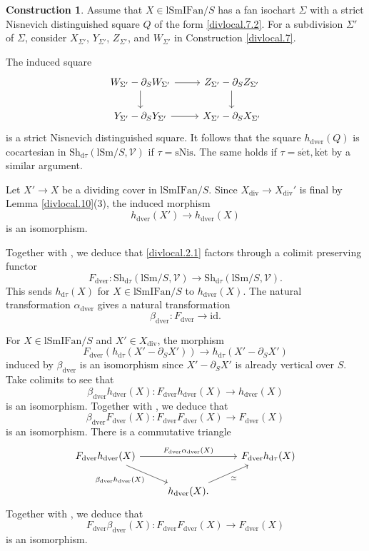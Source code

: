 \documentclass[10pt]{amsart}
\theoremstyle{definition}
\newtheorem{const}[thm]{Construction}
\theoremstyle{remark}
\numberwithin{equation}{subsection}
\newcommand{\cV}{\mathcal{V}}
\newcommand{\id}{\mathrm{id}}
\newcommand{\lSm}{\mathrm{lSm}}
\newcommand{\lSmIFan}{\mathrm{lSmIFan}}
\newcommand{\infShv}{\mathrm{Sh}}
\newcommand{\dver}{\mathrm{dver}}
\newcommand{\divi}{\mathrm{div}}
\newcommand{\dtau}{\mathrm{d}\tau}
\newcommand{\sNis}{\mathrm{sNis}}
\newcommand{\ketale}{\mathrm{k\acute{e}t}}
\newcommand{\setale}{\mathrm{s\acute{e}t}}
\begin{document}
\begin{const}
\label{divlocal.11}
Assume that $X\in \lSmIFan/S$ has a fan isochart $\Sigma$ with a strict Nisnevich distinguished square $Q$ of the form \eqref{divlocal.7.2}.
For a subdivision $\Sigma'$ of $\Sigma$, consider $X_{\Sigma'}$, $Y_{\Sigma'}$, $Z_{\Sigma'}$, and $W_{\Sigma'}$ in Construction \ref{divlocal.7}.

The induced square
\[
\begin{tikzcd}
W_{\Sigma'}-\partial_S W_{\Sigma'}\ar[d]\ar[r]&
Z_{\Sigma'}-\partial_S Z_{\Sigma'}\ar[d]
\\
Y_{\Sigma'}-\partial_S Y_{\Sigma'}\ar[r]&
X_{\Sigma'}-\partial_S X_{\Sigma'}
\end{tikzcd}
\]
is a strict Nisnevich distinguished square.
It follows that the square $h_{\dver}(Q)$ is cocartesian in $\infShv_{\dtau}(\lSm/S,\cV)$ if $\tau=\sNis$.
The same holds if $\tau=\setale,\ketale$ by a similar argument.

Let $X'\to X$ be a dividing cover in $\lSmIFan/S$.
Since $X_{\divi}\to X_{\divi}'$ is final by Lemma \ref{divlocal.10}(3), the induced morphism
\[
h_{\dver}(X')
\to
h_{\dver}(X)
\]
is an isomorphism.

Together with \cite[Proposition 5.5.4.20]{HTT}, we deduce that \eqref{divlocal.2.1} factors through a colimit preserving functor
\begin{equation}
\label{divlocal.2.2}
F_{\dver}
\colon
\infShv_{\dtau}(\lSm/S,\cV)
\to
\infShv_{\dtau}(\lSm/S,\cV).
\end{equation}
This sends $h_{\dtau}(X)$ for $X\in \lSmIFan/S$ to $h_{\dver}(X)$.
The natural transformation $\alpha_{\dver}$ gives a natural transformation
\begin{equation}
\beta_{\dver}
\colon
F_{\dver} \to \id.
\end{equation}

For $X\in \lSmIFan/S$ and $X'\in X_{\divi}$, the morphism
\[
F_{\dver}(h_{\dtau}(X'-\partial_S X'))
\to
h_{\dtau}(X'-\partial_S X')
\]
induced by $\beta_{\dver}$ is an isomorphism since $X'-\partial_S X'$ is already vertical over $S$.
Take colimits to see that 
\[
\beta_{\dver}h_{\dver}(X)
\colon
F_{\dver}h_{\dver}(X)\to h_{\dver}(X)
\]
is an isomorphism.
Together with \cite[Theorem 5.1.5.6, Proposition 5.5.4.20]{HTT}, we deduce that
\begin{equation}
\label{divlocal.2.6}
\beta_{\dver}F_{\dver}(X)
\colon
F_{\dver}F_{\dver}(X)\to F_{\dver}(X)
\end{equation}
is an isomorphism.
There is a commutative triangle
\[
\begin{tikzcd}
F_{\dver}h_{\dver}(X)\ar[rd,"\beta_{\dver}h_{\dver}(X)"']\ar[rr,"F_{\dver}\alpha_{\dver}(X)"]&
&
F_{\dver}h_{\dtau}(X)\ar[ld,"\simeq",leftarrow]
\\
&
h_{\dver}(X).
\end{tikzcd}
\]
Together with \cite[Theorem 5.1.5.6, Proposition 5.5.4.20]{HTT}, we deduce that
\begin{equation}
\label{divlocal.2.7}
F_{\dver}\beta_{\dver}(X)
\colon
F_{\dver}F_{\dver}(X)\to F_{\dver}(X)
\end{equation}
is an isomorphism.


\end{const}
\end{document}
